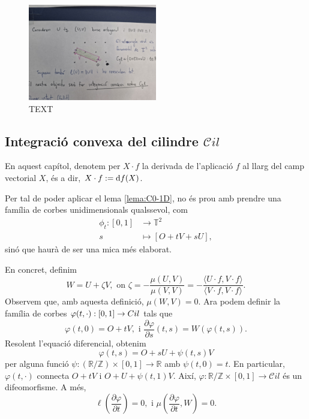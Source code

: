 \begin{figure}[htbp]
    \centering
    \includegraphics[width=0.5\textwidth]{Fotos/SETENA.jpg}
    \caption{{\color{blue}TEXT}}
    \label{fig:setena_foto}
\end{figure}

\subsection{Integració convexa del cilindre $\mathcal Cil$}
\begin{nota}
    En aquest capítol, denotem per $X\cdot f$ la derivada de l'aplicació $f$ al llarg del camp vectorial $X$, és a dir, $X\cdot f := \text df(X)$.
\end{nota}
Per tal de poder aplicar el lema \ref{lema:C0-1D}, no és prou amb prendre una família de corbes unidimensionals qualssevol, com
\begin{align}
    \nonumber\phi_t:[0,1]&\to\mathbb T^2\\
    \nonumber s&\mapsto [O+tV+sU],
\end{align}
sinó que haurà de ser una mica més elaborat. 

En concret, definim 
\begin{equation*}
    W=U+\zeta V, \text{ on } \zeta = -\frac{\mu(U,V)}{\mu(V,V)} = -\frac{\langle U\cdot f, V\cdot f\rangle}{\langle V\cdot f, V\cdot f\rangle}.
\end{equation*}
Observem que, amb aquesta definició, $\mu(W,V)=0$. Ara podem definir la família de corbes $\varphi(t,\cdot):[0,1]\to\mathbb \mathcal Cil$ tals que 
\begin{equation*}
    \varphi(t,0) = O + tV, \text{ i } \frac{\partial\varphi}{\partial s}(t,s) = W(\varphi(t,s)).
\end{equation*}
Resolent l'equació diferencial, obtenim
\begin{equation*}
    \varphi(t,s) = O + sU + \psi(t,s)V
\end{equation*}
per alguna funció $\psi:(\mathbb R/\mathbb Z)\times[0,1]\to\mathbb R$ amb $\psi(t,0)=t$. En particular, $\varphi(t,\cdot)$ connecta $O+tV$ i $O+U+\psi(t,1)V$. Així, $\varphi:\mathbb R/\mathbb Z\times[0,1]\to\mathcal Cil$ és un difeomorfisme. A més, 
\begin{equation*}
    \ell\left( \frac{\partial\varphi}{\partial t} \right) = 0, \text{ i } \mu\left( \frac{\partial\varphi}{\partial t}, W \right) = 0.
\end{equation*}

